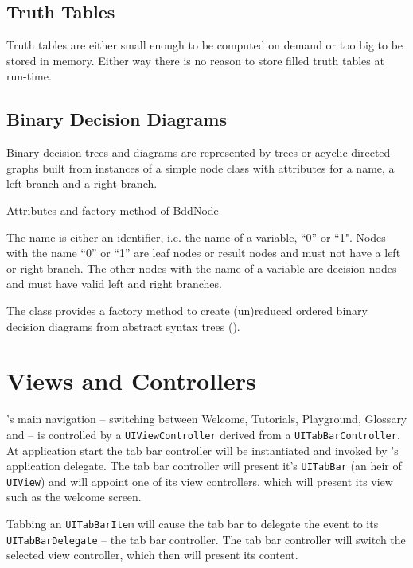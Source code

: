 \subsection{Truth Tables}

Truth tables are either small enough to be computed on demand or too big to be stored in memory.
Either way there is no reason to store filled truth tables at run-time.

\subsection{Binary Decision Diagrams}

Binary decision trees and diagrams are represented by trees 
or acyclic directed graphs built from instances of a simple node class
 with attributes for a name, a left branch and a right branch. 
\begin{table}[htdp]
\begin{center}
\caption{Attributes and factory method of BddNode}
\label{fig:BddNode}
\end{center}
\end{table}
The name is either an identifier, i.e. the name of a variable, “0” or “1". 
Nodes with the name “0” or “1” are leaf nodes or result nodes
and must not have a left or right branch.
The other nodes with the name of a variable are decision nodes 
and must have valid left and right branches. 

The class provides a factory method to create 
(un)reduced ordered binary decision diagrams from abstract syntax trees
().

\newpage
\section{Views and Controllers}

\Nyaya's main navigation – switching between Welcome, Tutorials, Playground, Glossary and \BoolTool – 
is controlled by a \verb+UIViewController+ derived from a \verb+UITabBarController+. 
At application start the tab bar controller will be instantiated and invoked by \Nyaya's application delegate. 
The tab bar controller will present it's \verb+UITabBar+ (an heir of \verb+UIView+)
and will appoint one of its view controllers, which will present its view such as the welcome screen.

Tabbing an \verb+UITabBarItem+ will cause the tab bar to delegate the event to its \verb+UITabBarDelegate+ – the tab bar controller.
The tab bar controller will switch the selected view controller, which then will present its content.

